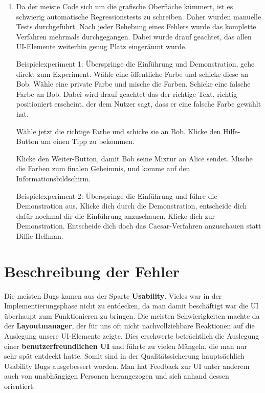 \documentclass{article}
\begin{document}
	  \begin{enumerate}
	      \item Da der meiste Code sich um die grafische Oberfläche kümmert, ist es schwierig
	          automatische Regressionstests zu schreiben. Daher wurden manuelle Tests durchgeführt.
	          Nach jeder Behebung eines Fehlers wurde das komplette Verfahren mehrmals durchgegangen.
	          Dabei wurde drauf geachtet, das allen UI-Elemente weiterhin genug Platz eingeräumt wurde.
	
	          Beispielexperiment 1:
	          Überspringe die Einführung und Demonstration, gehe direkt zum Experiment.
	          Wähle eine öffentliche Farbe und schicke diese an Bob.
	          Wähle eine private Farbe und mische die Farben. Schicke eine falsche
	          Farbe an Bob. Dabei wird drauf geachtet das der richtige Text, richtig positioniert
	          erscheint, der dem Nutzer sagt, dass er eine falsche Farbe gewählt hat.
	
	          Wähle jetzt die richtige Farbe und schicke sie an Bob.
	          Klicke den Hilfe-Button um einen Tipp zu bekommen.
	          
	          Klicke den Weiter-Button, damit Bob seine Mixtur an Alice sendet.
	          Mische die Farben zum finalen Geheimnis, und komme auf den Informationsbildschirm.
	
	          Beispielexperiment 2:
	          Überspringe die Einführung und führe die Demonstration aus.
	          Klicke dich durch die Demonstration, entscheide dich dafür
	          nochmal dir die Einführung anzuschauen. Klicke dich zur Demonstration.
	          Entscheide dich doch das Caesar-Verfahren anzuschauen statt Diffie-Hellman.
	      \end{enumerate}
\clearpage		

\section{Beschreibung der Fehler}
  Die meisten Bugs kamen aus der Sparte \textbf{Usability}. Vieles war in der Implementierungsphase nicht zu entdecken, da man damit beschäftigt
  war die UI überhaupt zum Funktionieren zu bringen. Die meisten Schwierigkeiten machte da der \textbf{Layoutmanager}, der für uns oft nicht
  nachvollziehbare Reaktionen auf die Auslegung unsere UI-Elemente zeigte.\newline 
  Dies erschwerte beträchtlich die Auslegung einer \textbf{benutzerfreundlichen UI} und führte zu vielen Mängeln, die man
  nur sehr spät entdeckt hatte. Somit sind in der Qualitätssicherung hauptsächlich Usability Bugs ausgebessert worden. 
  Man hat Feedback zur UI unter anderem auch von unabhängigen Personen herangezogen und sich anhand dessen orientiert. 
  
\end{document}
